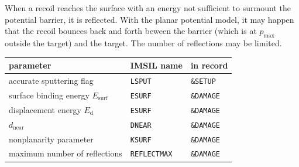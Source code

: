 When a recoil reaches the surface with an energy not sufficient to surmount the
potential barrier, it is reflected. With the planar potential model, it may
happen that the recoil bounces back and forth beween the barrier (which is
at $p_\mathrm{max}$ outside the target) and the target. The number of
reflections may be limited.

\begin{center}
\begin{tabular}{lll}
   parameter \quad                          & IMSIL name    & in record \\
   \hline
   accurate sputtering flag                 & {\tt LSPUT}   & {\tt \&SETUP} \\
   surface binding energy $E_\mathrm{surf}$ & {\tt ESURF}   & {\tt \&DAMAGE} \\
   displacement energy $E_\mathrm{d}$       & {\tt ESURF}   & {\tt \&DAMAGE} \\
   $d_\mathrm{near}$                        & {\tt DNEAR}   & {\tt \&DAMAGE} \\
   nonplanarity parameter                   & {\tt KSURF}   & {\tt \&DAMAGE} \\
   maximum number of reflections         & {\tt REFLECTMAX} & {\tt \&DAMAGE} \\
\end{tabular}
\end{center}

